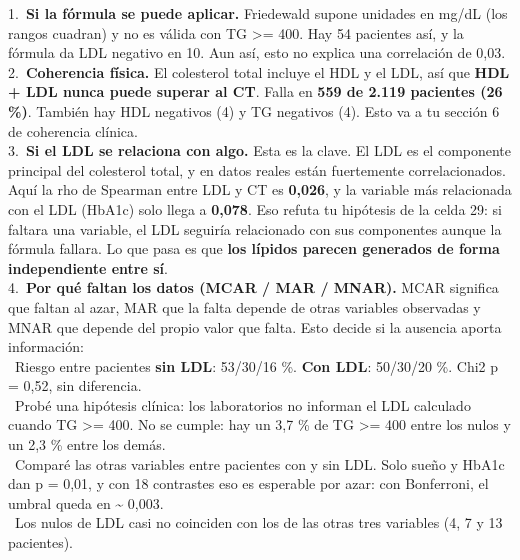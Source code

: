 \documentclass[11pt,a4paper]{article}
\begin{document}
{\hspace*{1.0em}1.~\textbf{Si la fórmula se puede aplicar.} Friedewald supone unidades en mg/\allowbreak{}dL (los rangos cuadran) y no es válida con TG \textgreater{}= 400. Hay 54 pacientes así, y la fórmula da LDL negativo en 10. Aun así, esto no explica una correlación de 0,03. \\{}
\hspace*{1.0em}2.~\textbf{Coherencia física.} El colesterol total incluye el HDL y el LDL, así que \textbf{HDL + LDL nunca puede superar al CT}. Falla en \textbf{559 de 2.119 pacientes (26 \%)}. También hay HDL negativos (4) y TG negativos (4). Esto va a tu sección 6 de coherencia clínica. \\{}
\hspace*{1.0em}3.~\textbf{Si el LDL se relaciona con algo.} Esta es la clave. El LDL es el componente principal del colesterol total, y en datos reales están fuertemente correlacionados. Aquí la rho de Spearman entre LDL y CT es \textbf{0,026}, y la variable más relacionada con el LDL (HbA1c) solo llega a \textbf{0,078}. Eso refuta tu hipótesis de la celda 29: si faltara una variable, el LDL seguiría relacionado con sus componentes aunque la fórmula fallara. Lo que pasa es que \textbf{los lípidos parecen generados de forma independiente entre sí}. \\{}
\hspace*{1.0em}4.~\textbf{Por qué faltan los datos (MCAR /\allowbreak{} MAR /\allowbreak{} MNAR).} MCAR significa que faltan al azar, MAR que la falta depende de otras variables observadas y MNAR que depende del propio valor que falta. Esto decide si la ausencia aporta información: \\{}
\hspace*{2.5em}\textbullet~Riesgo entre pacientes \textbf{sin LDL}: 53/\allowbreak{}30/\allowbreak{}16 \%. \textbf{Con LDL}: 50/\allowbreak{}30/\allowbreak{}20 \%. Chi2 p = 0,52, sin diferencia. \\{}
\hspace*{2.5em}\textbullet~Probé una hipótesis clínica: los laboratorios no informan el LDL calculado cuando TG \textgreater{}= 400. No se cumple: hay un 3,7 \% de TG \textgreater{}= 400 entre los nulos y un 2,3 \% entre los demás. \\{}
\hspace*{2.5em}\textbullet~Comparé las otras variables entre pacientes con y sin LDL. Solo sueño y HbA1c dan p = 0,01, y con 18 contrastes eso es esperable por azar: con Bonferroni, el umbral queda en \textasciitilde{} 0,003. \\{}
\hspace*{2.5em}\textbullet~Los nulos de LDL casi no coinciden con los de las otras tres variables (4, 7 y 13 pacientes).

}
\end{document}
